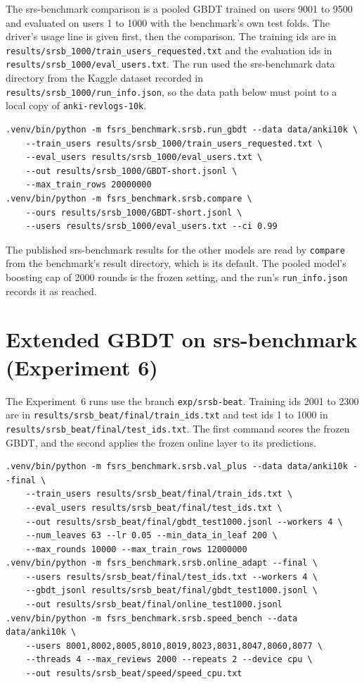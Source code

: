 The srs-benchmark comparison is a pooled GBDT trained on users 9001 to 9500 and evaluated on users 1 to 1000 with the benchmark's own test folds. The driver's usage line is given first, then the comparison. The training ids are in \texttt{results/srsb\_1000/train\_users\_requested.txt} and the evaluation ids in \texttt{results/srsb\_1000/eval\_users.txt}. The run used the srs-benchmark data directory from the Kaggle dataset recorded in \texttt{results/srsb\_1000/run\_info.json}, so the data path below must point to a local copy of \texttt{anki-revlogs-10k}.

\begingroup\footnotesize\begin{verbatim}
.venv/bin/python -m fsrs_benchmark.srsb.run_gbdt --data data/anki10k \
    --train_users results/srsb_1000/train_users_requested.txt \
    --eval_users results/srsb_1000/eval_users.txt \
    --out results/srsb_1000/GBDT-short.jsonl \
    --max_train_rows 20000000
.venv/bin/python -m fsrs_benchmark.srsb.compare \
    --ours results/srsb_1000/GBDT-short.jsonl \
    --users results/srsb_1000/eval_users.txt --ci 0.99
\end{verbatim}
\endgroup

The published srs-benchmark results for the other models are read by \texttt{compare} from the benchmark's result directory, which is its default. The pooled model's boosting cap of 2000 rounds is the frozen setting, and the run's \texttt{run\_info.json} records it as reached.

\section{Extended GBDT on srs-benchmark (Experiment 6)}

The Experiment~6 runs use the branch \texttt{exp/srsb-beat}. Training ids 2001 to 2300 are in
\texttt{results/srsb\_beat/final/train\_ids.txt} and test ids 1 to 1000 in \texttt{results/srsb\_beat/final/test\_ids.txt}.
The first command scores the frozen GBDT, and the second applies the frozen online layer to its predictions.

\begingroup\footnotesize\begin{verbatim}
.venv/bin/python -m fsrs_benchmark.srsb.val_plus --data data/anki10k --final \
    --train_users results/srsb_beat/final/train_ids.txt \
    --eval_users results/srsb_beat/final/test_ids.txt \
    --out results/srsb_beat/final/gbdt_test1000.jsonl --workers 4 \
    --num_leaves 63 --lr 0.05 --min_data_in_leaf 200 \
    --max_rounds 10000 --max_train_rows 12000000
.venv/bin/python -m fsrs_benchmark.srsb.online_adapt --final \
    --users results/srsb_beat/final/test_ids.txt --workers 4 \
    --gbdt_jsonl results/srsb_beat/final/gbdt_test1000.jsonl \
    --out results/srsb_beat/final/online_test1000.jsonl
.venv/bin/python -m fsrs_benchmark.srsb.speed_bench --data data/anki10k \
    --users 8001,8002,8005,8010,8019,8023,8031,8047,8060,8077 \
    --threads 4 --max_reviews 2000 --repeats 2 --device cpu \
    --out results/srsb_beat/speed/speed_cpu.txt
\end{verbatim}
\endgroup

